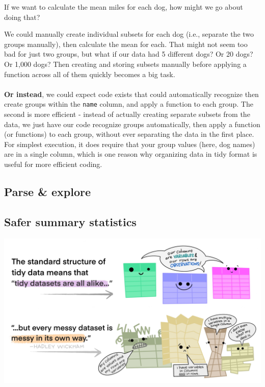 \documentclass[
]{book}
\begin{document}
If we want to calculate the mean miles for each dog, how might we go about doing that?

We could manually create individual subsets for each dog (i.e., separate the two groups manually), then calculate the mean for each. That might not seem too bad for just two groups, but what if our data had 5 different dogs? Or 20 dogs? Or 1,000 dogs? Then creating and storing subsets manually before applying a function across all of them quickly becomes a big task.\\
~\\
\textbf{Or instead}, we could expect code exists that could automatically recognize then create groups within the \texttt{name} column, and apply a function to each group. The second is more efficient - instead of actually creating separate subsets from the data, we just have our code recognize groups automatically, then apply a function (or functions) to each group, without ever separating the data in the first place. For simplest execution, it does require that your group values (here, dog names) are in a single column, which is one reason why organizing data in tidy format is useful for more efficient coding.

\hypertarget{parse-explore}{%
\subsection{Parse \& explore}\label{parse-explore}}

\hypertarget{safer-summary-statistics}{%
\subsection{Safer summary statistics}\label{safer-summary-statistics}}

\includegraphics[width=6.26042in,height=\textheight]{images/tidydata_2.jpg}
\end{document}
